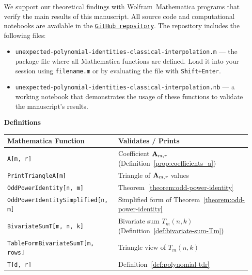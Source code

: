 We support our theoretical findings with Wolfram~Mathematica programs that verify the main results of this manuscript.
All source code and computational notebooks are available in the
\href{https://github.com/kolosovpetro/surprising-polynomial-identities-classical-interpolation}
{\texttt{GitHub repository}}.
The repository includes the following files:
\begin{itemize}
    \item \texttt{unexpected-polynomial-identities-classical-interpolation.m} --- the package file where
    all Mathematica functions are defined.
    Load it into your session using \texttt{filename.m} or by evaluating the file with \texttt{Shift+Enter}.
    \item \texttt{unexpected-polynomial-identities-classical-interpolation.nb} --- a working notebook that demonstrates
    the usage of these functions to validate the manuscript’s results.
\end{itemize}

\textbf{Definitions}
\begin{center}
    \renewcommand{\arraystretch}{1.3}
    \begin{tabular}{ll}
        \toprule
        \textbf{Mathematica Function}             & \textbf{Validates / Prints}                                        \\
        \midrule
        \texttt{A[m, r]}                          & Coefficient ${\mathbf{A}} \sb{m,r}$ (Definition~\ref{prop:coefficients_a}) \\
        \texttt{PrintTriangleA[m]}                & Triangle of ${\mathbf{A}} \sb{m,r}$ values                                 \\
        \texttt{OddPowerIdentity[n, m]}           & Theorem~\ref{theorem:odd-power-identity}                           \\
        \texttt{OddPowerIdentitySimplified[n, m]} & Simplified form of Theorem~\ref{theorem:odd-power-identity}        \\
        \texttt{BivariateSumT[m, n, k]}           & Bivariate sum $T_m(n, k)$ (Definition~\ref{def:bivariate-sum-Tm})  \\
        \texttt{TableFormBivariateSumT[m, rows]}  & Triangle view of $T_m(n, k)$                                       \\
        \texttt{T[d, r]}                          & Definition~\ref{def:polynomial-tdr}                                \\
        \bottomrule
    \end{tabular}
\end{center}


